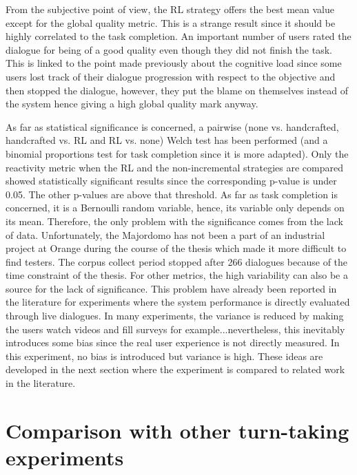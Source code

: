 	From the subjective point of view, the RL strategy offers the best mean value except for the global quality metric. This is a strange result since it should be highly correlated to the task completion. An important number of users rated the dialogue for being of a good quality even though they did not finish the task. This is linked to the point made previously about the cognitive load since some users lost track of their dialogue progression with respect to the objective and then stopped the dialogue, however, they put the blame on themselves instead of the system hence giving a high global quality mark anyway.
	
	As far as statistical significance is concerned, a pairwise (none vs. handcrafted, handcrafted vs. RL and RL vs. none) Welch test has been performed (and a binomial proportions test for task completion since it is more adapted). Only the reactivity metric when the RL and the non-incremental strategies are compared showed statistically significant results since the corresponding p-value is under 0.05. The other p-values are above that threshold. As far as task completion is concerned, it is a Bernoulli random variable, hence, its variable only depends on its mean. Therefore, the only problem with the significance comes from the lack of data. Unfortunately, the Majordomo has not been a part of an industrial project at Orange during the course of the thesis which made it more difficult to find testers. The corpus collect period stopped after 266 dialogues because of the time constraint of the thesis. For other metrics, the high variability can also be a source for the lack of significance. This problem have already been reported in the literature for experiments where the system performance is directly evaluated through live dialogues. In many experiments, the variance is reduced by making the users watch videos and fill surveys for example...nevertheless, this inevitably introduces some bias since the real user experience is not directly measured. In this experiment, no bias is introduced but variance is high. These ideas are developed in the next section where the experiment is compared to related work in the literature.


\section{Comparison with other turn-taking experiments}   

